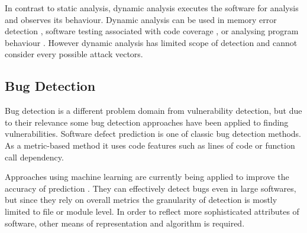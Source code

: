 In contrast to static analysis, dynamic analysis executes the software for analysis and observes its behaviour.
Dynamic analysis can be used in memory error detection \cite{valgrind}, software testing associated with code coverage \cite{huang2015code},
or analysing program behaviour \cite{newsome2005dynamic, enck2014taintdroid}.
However dynamic analysis has limited scope of detection and cannot consider every possible attack vectors.

\subsection{Bug Detection}

Bug detection is a different problem domain from vulnerability detection, but due to their relevance some bug detection approaches have been applied to finding vulnerabilities.
Software defect prediction \cite{khoshgoftaar2009attribute, lessmann2008benchmarking} is one of classic bug detection methods.
As a metric-based method it uses code features such as lines of code or function call dependency.

Approaches using machine learning are currently being applied to improve the accuracy of prediction \cite{gao2011choosing, wang2016automatically}.
They can effectively detect bugs even in large softwares, but since they rely on overall metrics the granularity of detection is mostly limited to file or module level.
In order to reflect more sophisticated attributes of software, other means of representation and algorithm is required.

